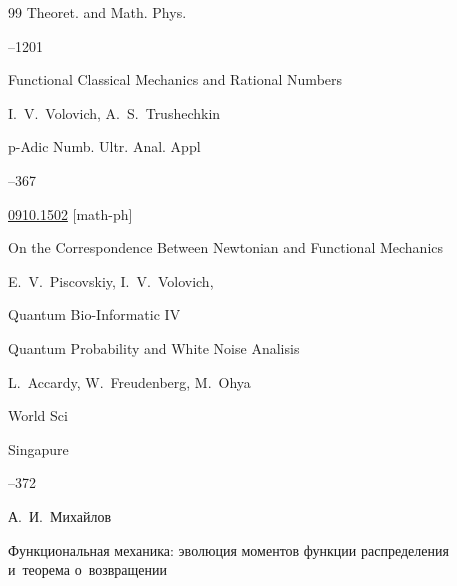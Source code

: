 \begin{thebibliography}{99}
\jour Theoret. and Math. Phys.




--1201








\paper Functional Classical Mechanics and Rational Numbers

\by I.~V.~Volovich, A.~S.~Trushechkin

\jour p-Adic Numb. Ultr. Anal. Appl




--367

\arxiv \href{http://arxiv.org/abs/0910.1502}{0910.1502} [math-ph]








\paper On the Correspondence Between Newtonian and Functional Mechanics

\by E.~V.~Piscovskiy, I.~V.~Volovich, 

\inbook Quantum Bio-Informatic IV

\serial Quantum Probability and White Noise Analisis


\eds L.~Accardy, W.~Freudenberg, M.~Ohya

\publ World Sci

\publaddr Singapure


--372






\by А.~И.~Михайлов

\paper Функциональная механика: эволюция моментов функции распределения и~теорема о~возвращении


\end{thebibliography}
